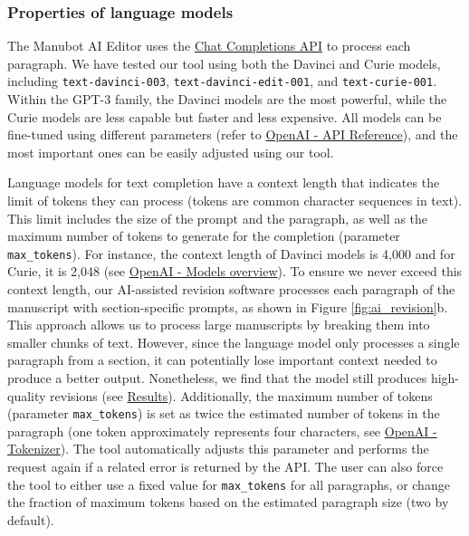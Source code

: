 \documentclass[
]{article}
\begin{document}
\hypertarget{properties-of-language-models}{%
\subsubsection{Properties of language models}\label{properties-of-language-models}}

The Manubot AI Editor uses the \href{https://platform.openai.com/docs/guides/text-generation/chat-completions-api}{Chat Completions API} to process each paragraph.
We have tested our tool using both the Davinci and Curie models, including \texttt{text-davinci-003}, \texttt{text-davinci-edit-001}, and \texttt{text-curie-001}.
Within the GPT-3 family, the Davinci models are the most powerful, while the Curie models are less capable but faster and less expensive.
All models can be fine-tuned using different parameters (refer to \href{https://platform.openai.com/docs/api-reference/chat/create}{OpenAI - API Reference}), and the most important ones can be easily adjusted using our tool.

Language models for text completion have a context length that indicates the limit of tokens they can process (tokens are common character sequences in text).
This limit includes the size of the prompt and the paragraph, as well as the maximum number of tokens to generate for the completion (parameter \texttt{max\_tokens}).
For instance, the context length of Davinci models is 4,000 and for Curie, it is 2,048 (see \href{https://platform.openai.com/docs/models/gpt-3}{OpenAI - Models overview}).
To ensure we never exceed this context length, our AI-assisted revision software processes each paragraph of the manuscript with section-specific prompts, as shown in Figure \ref{fig:ai_revision}b.
This approach allows us to process large manuscripts by breaking them into smaller chunks of text.
However, since the language model only processes a single paragraph from a section, it can potentially lose important context needed to produce a better output.
Nonetheless, we find that the model still produces high-quality revisions (see \protect\hyperlink{sec:results}{Results}).
Additionally, the maximum number of tokens (parameter \texttt{max\_tokens}) is set as twice the estimated number of tokens in the paragraph (one token approximately represents four characters, see \href{https://platform.openai.com/tokenizer}{OpenAI - Tokenizer}).
The tool automatically adjusts this parameter and performs the request again if a related error is returned by the API.
The user can also force the tool to either use a fixed value for \texttt{max\_tokens} for all paragraphs, or change the fraction of maximum tokens based on the estimated paragraph size (two by default).
\end{document}
